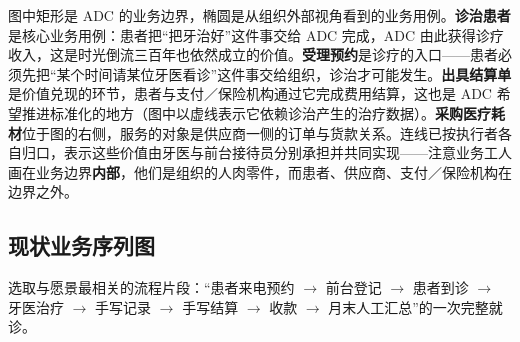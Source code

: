 \documentclass[11pt,a4paper]{ctexart}
\newcommand{\figtag}[1]{%
  \tikz[baseline=-0.35ex]{\node[fill=adcblue!90,text=white,rounded corners=1.5pt,
    inner xsep=5pt,inner ysep=1.2pt,font=\scriptsize\bfseries]{#1};}\hspace{2pt}}
\begin{document}
\figtag{图 1 说明} 图中矩形是 ADC 的业务边界，椭圆是从组织外部视角看到的业务用例。\textbf{诊治患者}是核心业务用例：患者把“把牙治好”这件事交给 ADC 完成，ADC 由此获得诊疗收入，这是时光倒流三百年也依然成立的价值。\textbf{受理预约}是诊疗的入口——患者必须先把“某个时间请某位牙医看诊”这件事交给组织，诊治才可能发生。\textbf{出具结算单}是价值兑现的环节，患者与支付／保险机构通过它完成费用结算，这也是 ADC 希望推进标准化的地方（图中以虚线表示它依赖诊治产生的治疗数据）。\textbf{采购医疗耗材}位于图的右侧，服务的对象是供应商一侧的订单与货款关系。连线已按执行者各自归口，表示这些价值由牙医与前台接待员分别承担并共同实现——注意业务工人画在业务边界\textbf{内部}，他们是组织的人肉零件，而患者、供应商、支付／保险机构在边界之外。

\subsection{现状业务序列图}

选取与愿景最相关的流程片段：“患者来电预约 $\rightarrow$ 前台登记 $\rightarrow$ 患者到诊 $\rightarrow$ 牙医治疗 $\rightarrow$ 手写记录 $\rightarrow$ 手写结算 $\rightarrow$ 收款 $\rightarrow$ 月末人工汇总”的一次完整就诊。
\end{document}
